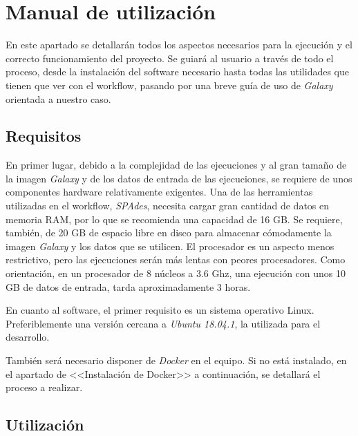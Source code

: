 \chapter{Manual de utilización}
\label{Anexo:manualuso}
En este apartado se detallarán todos los aspectos necesarios para la ejecución y el correcto funcionamiento del proyecto. Se guiará al usuario a través de todo el proceso, desde la instalación del software necesario hasta todas las utilidades que tienen que ver con el workflow, pasando por una breve guía de uso de \textit{Galaxy} orientada a nuestro caso.
\section{Requisitos}
En primer lugar, debido a la complejidad de las ejecuciones y al gran tamaño de la imagen \textit{Galaxy} y de los datos de entrada de las ejecuciones, se requiere de unos componentes hardware relativamente exigentes. Una de las herramientas utilizadas en el workflow, \textit{SPAdes}, necesita cargar gran cantidad de datos en memoria RAM, por lo que se recomienda una capacidad de 16 GB. Se requiere, también, de 20 GB de espacio libre en disco para almacenar cómodamente la imagen \textit{Galaxy} y los datos que se utilicen. El procesador es un aspecto menos restrictivo, pero las ejecuciones serán más lentas con peores procesadores. Como orientación, en un procesador de 8 núcleos a 3.6 Ghz, una ejecución con unos 10 GB de datos de entrada, tarda aproximadamente 3 horas.

En cuanto al software, el primer requisito es un sistema operativo Linux. Preferiblemente una versión cercana a \textit{Ubuntu 18.04.1}, la utilizada para el desarrollo.

También será necesario disponer de \textit{Docker} en el equipo. Si no está instalado, en el apartado de <<Instalación de Docker>> a continuación, se detallará el proceso a realizar.

\section{Utilización}
